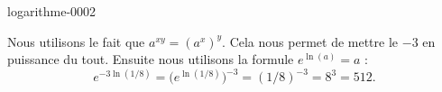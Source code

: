 
\begin{corrige}{logarithme-0002}

	Nous utilisons le fait que $a^{xy}=(a^x)^y$. Cela nous permet de mettre le $-3$ en puissance du tout. Ensuite nous utilisons la formule $ e^{\ln(a)}=a$ :
	\begin{equation}
		e^{-3\ln(1/8)}=\big(  e^{\ln(1/8)} \big)^{-3}=(1/8)^{-3}=8^3=512.
	\end{equation}

\end{corrige}
